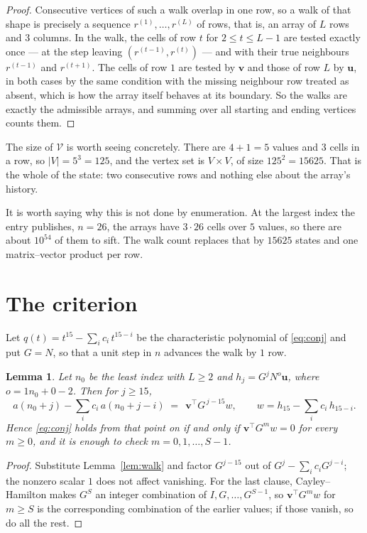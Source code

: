 \documentclass[11pt,a4paper]{article}
\theoremstyle{plain}
\newtheorem{lemma}[theorem]{Lemma}
\theoremstyle{definition}
\begin{document}
\begin{proof}
Consecutive vertices of such a walk overlap in one row, so a walk of that shape is
precisely a sequence $r^{(1)},\dots,r^{(L)}$ of rows, that is, an array of $L$ rows
and $3$ columns. In the walk, the cells of row $t$ for $2\le t\le L-1$ are tested
exactly once --- at the step leaving $(r^{(t-1)},r^{(t)})$ --- and with their true
neighbours $r^{(t-1)}$ and $r^{(t+1)}$. The cells of row $1$ are tested by
$\mathbf{v}$ and those of row $L$ by $\mathbf{u}$, in both cases by the same condition
with the missing neighbour row treated as absent, which is how the array itself behaves at
its boundary. So the walks are exactly the admissible arrays, and summing over all starting
and ending vertices counts them.
\end{proof}


The size of $\mathcal V$ is worth seeing concretely. There are $4+1=5$ values
and $3$ cells in a row, so $|V|=5^{3}=125$, and the vertex set is
$V\times V$, of size $125^2=15625$. That is the whole of the state: two consecutive
rows and nothing else about the array's history.

It is worth saying why this is not done by enumeration. At the largest index the entry
publishes, $n=26$, the arrays have $3\cdot26$ cells over
$5$ values, so there are about $10^{54}$ of them to sift. The
walk count replaces that by $15625$ states and one matrix--vector product per row.
\section{The criterion}

Let $q(t)=t^{15}-\sum_i c_i\,t^{15-i}$ be the characteristic polynomial of
\eqref{eq:conj} and put $G=N$, so that a unit step in $n$ advances the walk by
$1$ row.

\begin{lemma}\label{lem:crit}
Let $n_0$ be the least index with $L\ge2$ and $h_j=G^{j}N^{o}\mathbf{u}$, where
$o=1n_0+0-2$. Then for $j\ge15$,
\[
a(n_0+j)-\sum_i c_i\,a(n_0+j-i)\;=\;\,\mathbf{v}^{\!\top}G^{\,j-15}w,
\qquad w=h_{15}-\sum_i c_i\,h_{15-i} .
\]
Hence \eqref{eq:conj} holds from that point on if and only if
$\mathbf{v}^{\!\top}G^{m}w=0$ for every $m\ge0$, and it is enough to check
$m=0,1,\dots,S-1$.
\end{lemma}

\begin{proof}
Substitute Lemma~\ref{lem:walk} and factor $G^{j-15}$ out of
$G^{j}-\sum_ic_iG^{j-i}$; the nonzero scalar $1$ does not affect
vanishing. For the last clause, Cayley--Hamilton makes $G^{S}$ an integer combination of
$I,G,\dots,G^{S-1}$, so $\mathbf{v}^{\!\top}G^{m}w$ for $m\ge S$ is the corresponding
combination of the earlier values; if those vanish, so do all the rest.
\end{proof}
\end{document}
